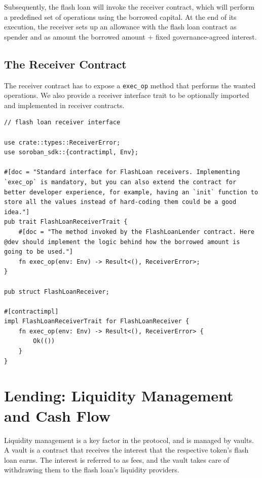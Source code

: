 \documentclass[twocolumn]{article}
\begin{document}
Subsequently, the flash loan will invoke the receiver contract, which will perform a predefined set of operations using the borrowed capital. At the end of its execution, the receiver sets up an allowance with the flash loan contract as spender and as amount the borrowed amount \(+\) fixed governance-agreed interest.

\subsection{The Receiver Contract}

The receiver contract has to expose a \texttt{exec\_op} method that performs the wanted operations. We also provide a receiver interface trait to be optionally imported and implemented in receiver contracts.

\begin{lstlisting}
// flash loan receiver interface

use crate::types::ReceiverError;
use soroban_sdk::{contractimpl, Env};

#[doc = "Standard interface for FlashLoan receivers. Implementing `exec_op` is mandatory, but you can also extend the contract for better developer experience, for example, having an `init` function to store all the values instead of hard-coding them could be a good idea."]
pub trait FlashLoanReceiverTrait {
    #[doc = "The method invoked by the FlashLoanLender contract. Here @dev should implement the logic behind how the borrowed amount is going to be used."]
    fn exec_op(env: Env) -> Result<(), ReceiverError>;
}

pub struct FlashLoanReceiver;

#[contractimpl]
impl FlashLoanReceiverTrait for FlashLoanReceiver {
    fn exec_op(env: Env) -> Result<(), ReceiverError> {
        Ok(())
    }
}
\end{lstlisting}

\vspace{20px}

\section{Lending: Liquidity Management and Cash Flow}

Liquidity management is a key factor in the protocol, and is managed by vaults. A vault is a contract that receives the interest that the respective token's flash loan earns. The interest is referred to as fees, and the vault takes care of withdrawing them to the flash loan's liquidity providers.
\end{document}
